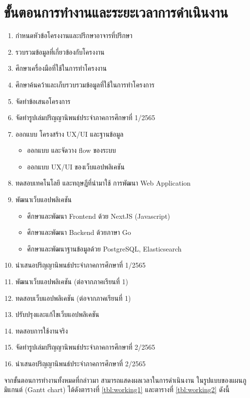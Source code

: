 \documentclass[12pt,oneside,openright,a4paper]{cpe-thai-project}
\begin{document}
\section{ขั้นตอนการทํางานและระยะเวลาการดําเนินงาน}
\begin{enumerate}
  \item{กำหนดหัวข้อโครงงานและปรึกษาอาจารที่ปรึกษา} 
  \item{รวบรวมข้อมูลที่เกี่ยวข้องกับโครงงาน}
  \item{ศึกษาเครื่องมือที่ใช้ในการทำโครงงาน}
  \item{ศึกษาค้นคว้าและเก็บรวบรวมข้อมูลที่ใช้ในการทำโครงการ}
  \item{จัดทำข้อเสนอโครงการ}
  \item{จัดทำรูปเล่มปริญญานิพนธ์ประจำภาคการศึกษาที่ 1/2565}
  \item{ออกแบบ โครงสร้าง UX/UI และฐานข้อมูล}
  \begin{itemize}
        \item{ออกแบบ และจัดวาง flow ของระบบ}
        \item{ออกแบบ UX/UI ของเว็บแอปพลิเคชัน}
    \end{itemize}
\item{ทดสอบเทคโนโลยี และทฤษฎีที่นำมาใช้ การพัฒนา Web  Application}
\item{พัฒนาเว็บแอปพลิเคชัน}
    \begin{itemize}
        \item{ศึกษาและพัฒนา Frontend ด้วย NextJS (Javascript)}
        \item{ศึกษาและพัฒนา Backend ด้วยภาษา Go}
        \item{ศึกษาและพัฒนาฐานข้อมูลด้วย PostgreSQL, Elasticsearch}
    \end{itemize}
  \item{นำเสนอปริญญานิพนธ์ประจำภาคการศึกษาที่ 1/2565}
  \item{พัฒนาเว็บแอปพลิเคชัน (ต่อจากภาคเรียนที่ 1)}
  \item{ทดสอบเว็บแอปพลิเคชัน (ต่อจากภาคเรียนที่ 1)}
  \item{ปรับปรุงและแก้ไขเว็บแอปพลิเคชัน}
  \item{ทดสอบการใช้งานจริง}
  \item{จัดทำรูปเล่มปริญญานิพนธ์ประจำภาคการศึกษาที่ 2/2565}
  \item{นำเสนอปริญญานิพนธ์ประจำภาคการศึกษาที่ 2/2565}
\end{enumerate}
\hspace*{1cm}จากขั้นตอนการทำงานทั้งหมดที่กล่าวมา สามารถแสดงผลเวลาในการดำเนินงาน ในรูปแบบของแผนภูมิแกนต์ (Gantt chart) ได้ดังตารางที่ \ref{tbl:working1} และตารางที่ \ref{tbl:working2} ดังนี้
\end{document}
